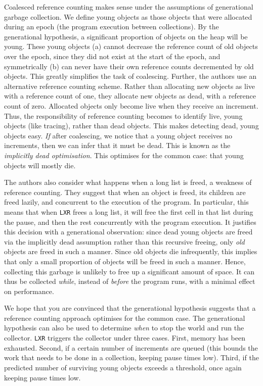 Coalesced reference counting makes sense under the assumptions of generational garbage collection. We define young objects as those objects that were allocated during an epoch (the program execution between collections). By the generational hypothesis, a significant proportion of objects on the heap will be young. These young objects (a) cannot decrease the reference count of old objects over the epoch, since they did not exist at the start of the epoch, and symmetrically (b) can never have their own reference counts decremented by old objects. This greatly simplifies the task of coalescing. Further, the authors use an alternative reference counting scheme. Rather than allocating new objects as live with a reference count of one, they allocate new objects as dead, with a reference count of zero. Allocated objects only become live when they receive an increment. Thus, the responsibility of reference counting becomes to identify live, young objects (like tracing), rather than dead objects. This makes detecting dead, young objects easy. \textit{If} after coalescing, we notice that a young object receives no increments, then we can infer that it must be dead. This is known as the \textit{implicitly dead optimisation}. This optimises for the common case: that young objects will mostly die.

The authors also consider what happens when a long list is freed, a weakness of reference counting. They suggest that when an object is freed, its children are freed lazily, and concurrent to the execution of the program. In particular, this means that when \texttt{LXR} frees a long list, it will free the first cell in that list during the pause, and then the rest concurrently with the program execution. It justifies this decision with a generational observation: since dead young objects are freed via the implicitly dead assumption rather than this recursive freeing, only \textit{old} objects are freed in such a manner. Since old objects die infrequently, this implies that only a small proportion of objects will be freed in such a manner. Hence, collecting this garbage is unlikely to free up a significant amount of space. It can thus be collected \textit{while}, instead of \textit{before} the program runs, with a minimal effect on performance.

We hope that you are convinced that the generational hypothesis suggests that a reference counting approach optimises for the common case. The generational hypothesis can also be used to determine \textit{when} to stop the world and run the collector. \texttt{LXR} triggers the collector under three cases. First, memory has been exhausted. Second, if a certain number of increments are queued (this bounds the work that needs to be done in a collection, keeping pause times low). Third, if the predicted number of surviving young objects exceeds a threshold, once again keeping pause times low.

